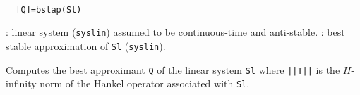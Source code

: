 \begin{mandesc}
   \\ %
\end{mandesc}
\begin{calling_sequence}
\begin{verbatim}
  [Q]=bstap(Sl)  
\end{verbatim}
\end{calling_sequence}
\begin{parameters}
  \begin{varlist}
    : linear system (\verb!syslin!) assumed to be continuous-time and anti-stable.
    : best stable approximation of \verb!Sl! (\verb!syslin!).
  \end{varlist}
\end{parameters}
\begin{mandescription}
  Computes the best approximant \verb!Q! of the linear system \verb!Sl! where
  \verb!||T||! is the  $H$-infinity norm of the Hankel operator associated with \verb!Sl!.
\end{mandescription}
\begin{manseealso}
\end{manseealso}
